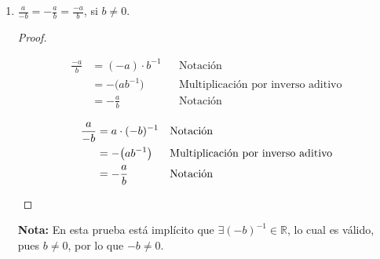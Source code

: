 \documentclass[11pt]{article}
\newcommand{\R}{\mathbb{R}}
\begin{document}
\begin{enumerate}[label=\alph*)]
 \item $\frac{a}{-b} = -\frac{a}{b}=\frac{-a}{b}$, si $b\neq 0$.
 \begin{proof} \leavevmode
  \begin{center}\vspace{-2em}
   \begin{minipage}[t]{.5\linewidth}
    \begin{align*}
     \frac{-a}{b} &= (-a)\cdot b^{-1} && \text{Notación}\\
     &= -\bigl(ab^{-1}\bigr) && \text{Multiplicación por inverso aditivo}\\
     &= -\frac{a}{b} && \text{Notación}
    \end{align*}
   \end{minipage}%
   \begin{minipage}[t]{.5\linewidth}
    \begin{align*}
     \frac{a}{-b} &= a \cdot (-b)^{-1} && \text{Notación}\\
   &= -\bigl(ab^{-1}\bigr) && \text{Multiplicación por inverso aditivo}\\
   &= -\frac{a}{b} && \text{Notación} \qedhere
    \end{align*}
   \end{minipage}
   \end{center} 
 \end{proof}
 \textbf{Nota:} En esta prueba está implícito que $\exists (-b)^{-1}\in \R$, lo cual es válido, pues $b\neq 0$, por lo que $-b\neq 0$.

\end{enumerate}
\end{document}
